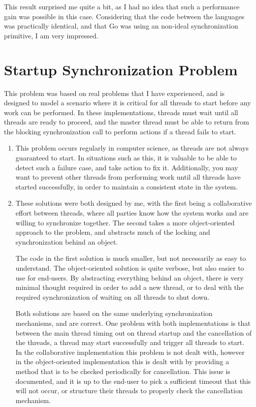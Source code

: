 \documentclass[a4paper,10pt]{article}
\begin{document}
This result surprised me quite a bit, as I had no idea that such a performance gain was possible in this case. Considering that the code between the languages was practically identical, and that Go was using an non-ideal synchronization primitive, I am very impressed.

\section{Startup Synchronization Problem}

This problem was based on real problems that I have experienced, and is designed to model a scenario where it is critical for all threads to start before any work can be performed. In these implementations, threads must wait until all threads are ready to proceed, and the master thread must be able to return from the blocking synchronization call to perform actions if a thread fails to start.

\newpage
\begin{enumerate}
    \item This problem occurs regularly in computer science, as threads are not always guaranteed to start. In situations such as this, it is valuable to be able to detect such a failure case, and take action to fix it. Additionally, you may want to prevent other threads from performing work until all threads have started successfully, in order to maintain a consistent state in the system.
    \item These solutions were both designed by me, with the first being a collaborative effort between threads, where all parties know how the system works and are willing to synchronize together. The second takes a more object-oriented approach to the problem, and abstracts much of the locking and synchronization behind an object.
    
    The code in the first solution is much smaller, but not necessarily as easy to understand. The object-oriented solution is quite verbose, but also easier to use for end-users. By abstracting everything behind an object, there is very minimal thought required in order to add a new thread, or to deal with the required synchronization of waiting on all threads to shut down.
    
    Both solutions are based on the same underlying synchronization mechanisms, and are correct. One problem with both implementations is that between the main thread timing out on thread startup and the cancellation of the threads, a thread may start successfully and trigger all threads to start. In the collaborative implementation this problem is not dealt with, however in the object-oriented implementation this is dealt with by providing a method that is to be checked periodically for cancellation. This issue is documented, and it is up to the end-user to pick a sufficient timeout that this will not occur, or structure their threads to properly check the cancellation mechanism.
\end{enumerate}
\end{document}
